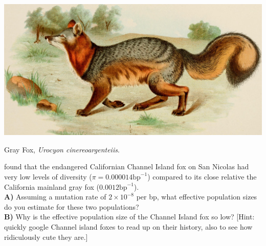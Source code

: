 
\begin{marginfigure}
\begin{center}
  \includegraphics[width =
  \textwidth]{illustration_images/Quant_gen/Grey_fox/14770789583_4db7ec5164_o.jpg}  %
\end{center}
\caption{Gray Fox, {\it Urocyon cinereoargenteiis}. }
\end{marginfigure}


\begin{question}
\citet{robinson:16} found that the endangered Californian Channel Island fox on San Nicolas had very
low levels of diversity ($\pi =0.000014 \text{bp}^{-1}$) compared to
its close relative the California mainland gray fox ($0.0012\text{bp}^{-1}$). \\
{\bf A)} Assuming a mutation rate of $2\times 10^{-8}$ per bp, what
effective population sizes do you estimate for these two populations?
\\
{\bf B)} Why is the effective population size of the Channel Island fox
so low? [Hint: quickly google Channel island foxes to read up on their
history, also to see how ridiculously cute they are.]
\end{question}



